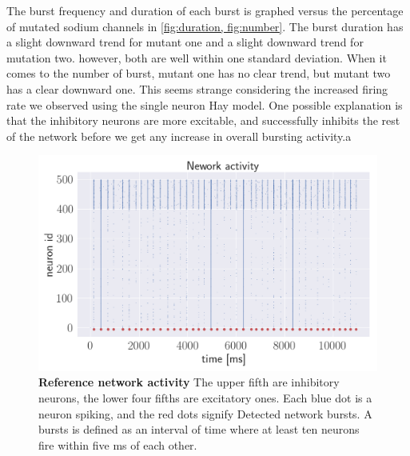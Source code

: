 The burst frequency and duration of each burst is graphed versus the percentage of mutated sodium
channels in \cref{fig:duration, fig:number}. The burst duration has a slight downward trend for
mutant one and a slight downward trend for mutation two. however, both are well within one standard
deviation. When it comes to the number of burst, mutant one has no clear trend, but mutant two has
a clear downward one. This seems strange considering the increased firing rate we observed using
the single neuron Hay model. One possible explanation is that the inhibitory neurons are more
excitable, and successfully inhibits the rest of the network before we get any increase in overall
bursting activity.a %


\begin{figure}
    \centering
    \includegraphics[width=1\textwidth]{images/network.png}
    \caption{\textbf{Reference network activity} The upper fifth are inhibitory neurons, the lower
        four fifths are excitatory ones. Each blue dot is a neuron spiking, and the red dots signify
        Detected network bursts. A bursts is defined as an interval of time where at least ten neurons
        fire within five ms of each other.}
    \label{fig:network-activity}
\end{figure}

